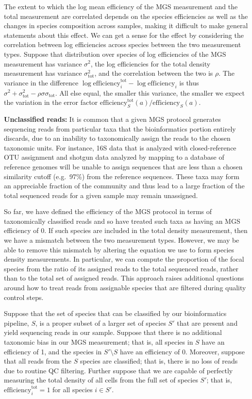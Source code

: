 \documentclass[
]{article}
\begin{document}
The extent to which the log mean efficiency of the MGS measurement and the total measurement are correlated depends on the species efficiencies as well as the changes in species composition across samples, making it difficult to make general statements about this effect.
We can get a sense for the effect by considering the correlation between log efficiencies across species between the two measurement types.
Suppose that distribution over species of log efficiencies of the MGS measurement has variance \(\sigma^{2}\), the log efficiencies for the total density measurement has variance \(\sigma_{\text{tot}}^{2}\), and the correlation between the two is \(\rho\).
The variance in the difference \(\log \text{efficiency}_{i}^{\text{tot}} - \log \text{efficiency}_{i}\) is thus \(\sigma^{2} + \sigma_{\text{tot}}^{2} - \rho \sigma \sigma_{\text{tot}}\).
All else equal, the smaller this variance, the smaller we expect the variation in the error factor \(\text{efficiency}^{\text{tot}}_S(a)/ \text{efficiency}_S(a)\).

\textbf{Unclassified reads:} It is common that a given MGS protocol generates sequencing reads from particular taxa that the bioinformatics portion entirely discards, due to an inability to taxonomically assign the reads to the chosen taxonomic units.
For instance, 16S data that is analyzed with closed-reference OTU assignment and shotgun data analyzed by mapping to a database of reference genomes will be unable to assign sequences that are less than a chosen similarity cutoff (e.g.~97\%) from the reference sequences.
These taxa may form an appreciable fraction of the community and thus lead to a large fraction of the total sequenced reads for a given sample may remain unassigned.

So far, we have defined the efficiency of the MGS protocol in terms of taxonomically classified reads and so have treated such taxa as having an MGS efficiency of 0.
If such species are included in the total density measurement, then we have a mismatch between the two measurement types.
However, we may be able to remove this mismatch by altering the equation we use to form species density measurements.
In particular, we can compute the proportion of the focal species from the ratio of its assigned reads to the total sequenced reads, rather than to the total set of assigned reads.
This approach raises additional questions around how to treat reads from assignable species that are filtered during quality control steps.

Suppose that the set of species that can be classified by our bioinformatics pipeline, \(S\), is a proper subset of a larger set of species \(S'\) that are present and yield sequencing reads in our sample.
Suppose that there is no additional taxonomic bias in our MGS measurement; that is, all species in \(S\) have an efficiency of 1, and the species in \(S' \setminus S\) have an efficiency of 0.
Moreover, suppose that all reads from the \(S\) species are classified; that is, there is no loss of reads due to routine QC filtering.
Further suppose that we are capable of perfectly measuring the total density of all cells from the full set of species \(S'\); that is, \(\text{efficiency}^{\text{tot}}_{i} = 1\) for all species \(i \in S'\).
\end{document}

